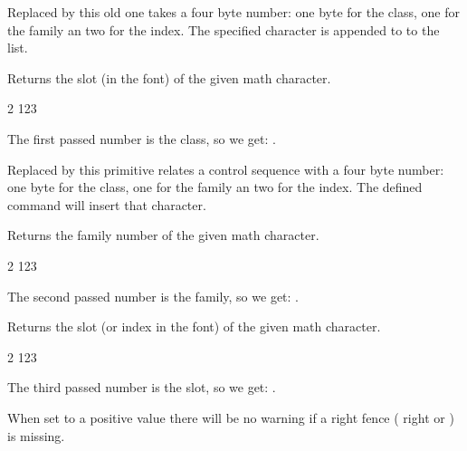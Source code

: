Replaced by  this old one takes a four byte number: one byte for
the class, one for the family an two for the index. The specified character is
appended to to the list.

\stopoldprimitive

\startnewprimitive[title={\prm {mathcharclass}}]

Returns the slot (in the font) of the given math character.

\startbuffer
\the\mathcharclass{} 2 123
\stopbuffer

\typebuffer

The first passed number is the class, so we get: \inlinebuffer.

\stopnewprimitive

\startoldprimitive[title={\prm {mathchardef}}][obsolete=yes]

Replaced by  this primitive relates a control sequence with a
four byte number: one byte for the class, one for the family an two for the
index. The defined command will insert that character.

\stopoldprimitive

\startnewprimitive[title={\prm {mathcharfam}}]

Returns the family number of the given math character.

\startbuffer
\the\mathcharfam{} 2 123
\stopbuffer

\typebuffer

The second passed number is the family, so we get: \inlinebuffer.

\stopnewprimitive

\startnewprimitive[title={\prm {mathcharslot}}]

Returns the slot (or index in the font) of the given math character.

\startbuffer
\the\mathcharslot{} 2 123
\stopbuffer

\typebuffer

The third passed number is the slot, so we get: \inlinebuffer.

\stopnewprimitive

\startnewprimitive[title={\prm {mathcheckfencesmode}}]

When set to a positive value there will be no warning if a right fence (\prm
{right} or ) is missing.

\stopnewprimitive

\startoldprimitive[title={\prm {mathchoice}}]

